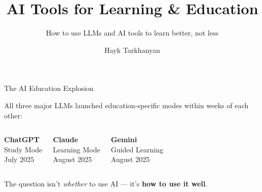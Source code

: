 \documentclass[aspectratio=169]{beamer}
\title{AI Tools for Learning \& Education}
\subtitle{How to use LLMs and AI tools to learn better, not less}
\author{Hayk Tarkhanyan}
\date{}
\begin{document}
\begin{frame}
\titlepage
\end{frame}

\begin{frame}{The AI Education Explosion}

\begin{center}
\end{center}

\bigskip
All three major LLMs launched education-specific modes within weeks of each other:

\begin{columns}[T]
\begin{center}
\textbf{\color{popblue}ChatGPT}\\Study Mode\\{\small July 2025}
\end{center}

\begin{center}
\textbf{\color{violet1}Claude}\\Learning Mode\\{\small August 2025}
\end{center}

\begin{center}
\textbf{\color{paramgreen}Gemini}\\Guided Learning\\{\small August 2025}
\end{center}
\end{columns}

\bigskip
\begin{center}
The question isn't \emph{whether} to use AI --- it's \textbf{how to use it well}.
\end{center}
\end{frame}
\end{document}
